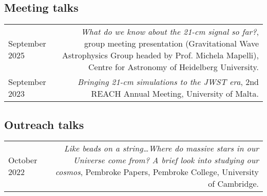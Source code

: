 \documentclass{article}
\begin{document}
\subsection*{Meeting talks}
\begin{longtable}{L!{\vrule}R}

    September 2025 & \textit{What do we know about the 21-cm signal so far?}, group meeting presentation (Gravitational Wave Astrophysics Group headed by Prof. Michela Mapelli), Centre for Astronomy of Heidelberg University. \\

    September 2023 & \textit{Bringing 21-cm simulations to the JWST era}, 2nd REACH Annual Meeting, University of Malta. \\

\end{longtable}

\subsection*{Outreach talks}
\begin{longtable}{L!{\vrule}R}

  October 2022 & \textit{Like beads on a string\ldots Where do massive stars in our Universe come from? A brief look into studying our cosmos}, Pembroke Papers, Pembroke College, University of Cambridge. \\

\end{longtable}

\begin{comment}
\section*{Posters Presentations}

\begin{longtable}{L!{\vrule}R}
	March 2021 & \href{https://github.com/htjb/Talks/blob/master/Posters/SKA_globalemu_March_2021/globalemu.pdf}{\textit{globalemu: A novel and robust approach for emulating the sky averaged 21-cm signal from the cosmic dawn and epoch of reionization}}, A Precursor View of the SKA Sky, Virtual Conference\\
	December 2019 & \href{https://drive.google.com/file/d/1dvgumyu4cXxXqoYxikU3DKOa4u_gpGzn/view}{\textit{REACH: Radio Experiment for the Analysis of Cosmic Hydrogen}}, Science At Low Frequencies VI, Arizona State University \\
	November 2019 & \href{https://github.com/htjb/Talks/blob/master/Posters/Cav_Graduate_Conf_REACH_Nov_2019/REACH_poster.pdf}{\textit{REACH: Radio Experiment for the Analysis of Cosmic Hydrogen}}, Cavendish Graduate Conference, University of Cambridge
\end{longtable}
\end{comment}
\end{document}
